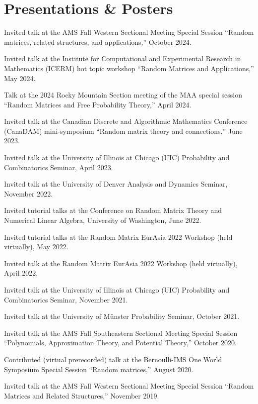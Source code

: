 \documentclass[letterpaper]{article}
\renewenvironment{itemize}{
  \begin{list}{}{
    \setlength{\leftmargin}{1em}
  }
}{
  \end{list}
}
\begin{document}
\section*{Presentations \& Posters}
\begin{itemize}
	\item Invited talk at the AMS Fall Western Sectional Meeting Special Session ``Random matrices, related structures, and applications,'' October 2024.
	\item Invited talk at the Institute for Computational and Experimental Research in Mathematics (ICERM) hot topic workshop ``Random Matrices and Applications,'' May 2024. 
	\item Talk at the 2024 Rocky Mountain Section meeting of the MAA special session ``Random Matrices and Free Probability Theory,'' April 2024. 
	\item Invited talk at the Canadian Discrete and Algorithmic Mathematics Conference (CanaDAM) mini-symposium ``Random matrix theory and connections,'' June 2023. 
	\item Invited talk at the University of Illinois at Chicago (UIC) Probability and Combinatorics Seminar, April 2023. 
	\item Invited talk at the University of Denver Analysis and Dynamics Seminar, November 2022.  
	\item Invited tutorial talks at the Conference on Random Matrix Theory and Numerical Linear Algebra, University of Washington, June 2022.  
	\item Invited tutorial talks at the Random Matrix EurAsia 2022 Workshop (held virtually), May 2022.  
	\item Invited talk at the Random Matrix EurAsia 2022 Workshop (held virtually), April 2022.  
	\item Invited talk at the University of Illinois at Chicago (UIC) Probability and Combinatorics Seminar, November 2021.  
	\item Invited talk at the University of M\"{u}nster Probability Seminar, October 2021.
	\item Invited talk at the AMS Fall Southeastern Sectional Meeting Special Session ``Polynomials, Approximation Theory, and Potential Theory,'' October 2020.  
	\item Contributed (virtual prerecorded) talk at the Bernoulli-IMS One World Symposium Special Session ``Random matrices,'' August 2020.  
	\item Invited talk at the AMS Fall Western Sectional Meeting Special Session ``Random Matrices and Related Structures,'' November 2019.  

\end{itemize}
\end{document}
